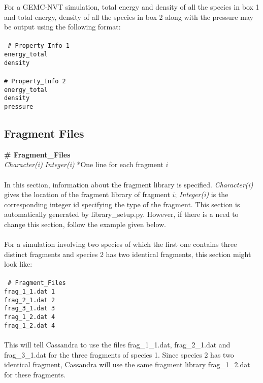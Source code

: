 %
For a GEMC-NVT simulation, total energy and density of all the species in box 1 and total energy, density of
all the species in box 2 along with the pressure may be output using the following format: \\ \\
%
\texttt{
\# Property\_Info 1 \\
energy\_total \\
density \\ \\
%
\# Property\_Info 2 \\
energy\_total \\
density \\ 
pressure }
%
%
%
\subsection{Fragment Files}\label{sec:Fragment_Files}
{\bf \# Fragment\_Files} \\
{\it Character(i)} {\it Integer(i)} *One line for each fragment $i$ \\ \\
%
In this section, information about the fragment library is specified. {\it Character(i)} gives
the location of the fragment library of fragment $i$; {\it Integer(i)} is the
corresponding integer id specifying the type of the fragment. This section is automatically
generated by library\_setup.py. However, if there is a need to change this section, follow the example
given below. \\ \\
%
For a simulation involving two species of which the first one contains three distinct fragments and species 2
has two identical fragments, this section might look like: \\ \\
%
\texttt{
\# Fragment\_Files  \\
frag\_1\_1.dat 1 \\
frag\_2\_1.dat 2 \\
frag\_3\_1.dat 3 \\
frag\_1\_2.dat 4 \\
frag\_1\_2.dat 4 \\ \\
}
%
This will tell Cassandra to use the files frag\_1\_1.dat, frag\_2\_1.dat and frag\_3\_1.dat for the three
fragments of species 1. Since species 2 has two identical fragment, Cassandra will use the same
fragment library frag\_1\_2.dat for these fragments. 

